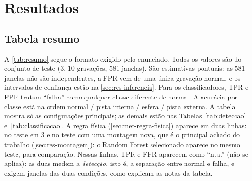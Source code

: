 \chapter{Resultados}
\label{cap:resultados}

\section{Tabela resumo}
\label{sec:tabela-resumo}

A \autoref{tab:resumo} segue o formato exigido pelo enunciado. Todos os valores
são do conjunto de teste (\SI{3}{\hp}, 10 gravações, 581 janelas). São
estimativas pontuais: as 581 janelas não são independentes, a FPR vem de uma
única gravação normal, e os intervalos de confiança estão na
\autoref{sec:res-inferencia}. Para os
classificadores, TPR e FPR tratam ``falha'' como qualquer classe diferente de
normal. A acurácia por classe está na ordem normal / pista interna / esfera /
pista externa. A tabela mostra só as configurações principais; as demais estão
nas Tabelas~\ref{tab:deteccao} e~\ref{tab:classificacao}. A regra física
(\autoref{sec:met-regra-fisica}) aparece em duas linhas: no teste em \SI{3}{\hp}
e no teste com uma montagem nova, que é o principal achado do trabalho
(\autoref{sec:res-montagem}); o Random Forest selecionado aparece no mesmo teste,
para comparação. Nessas linhas, TPR e FPR aparecem como ``n.\,a.'' (não se
aplica): as duas medem a \emph{detecção}, isto é, a separação entre normal e
falha, e exigem janelas das duas condições, como explicam as notas da
tabela.

